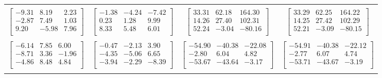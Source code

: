 \documentclass[12pt,a4paper,onesided]{report}
\begin{document}
\begin{table}[h]
{\begin{tabular}{cccc}
			\\&&&
			\\
				$\begin{bmatrix}-9.31&8.19&2.23\\-2.87&7.49&1.03\\9.20&-5.98&7.96\\\end{bmatrix}$&
				$\begin{bmatrix}-1.38&-4.24&-7.42\\0.23&1.28&9.99\\8.33&5.48&6.01\\\end{bmatrix}$&
				$\begin{bmatrix}33.31&62.18&164.30\\14.26&27.40&102.31\\52.24&-3.04&-80.16\\\end{bmatrix}$&
				$\begin{bmatrix}33.29&62.25&164.22\\14.25&27.42&102.29\\52.21&-3.09&-80.15\\\end{bmatrix}$
			\\&&&
			\\
				$\begin{bmatrix}-6.14&7.85&6.00\\-8.71&3.36&-1.96\\-4.86&8.48&4.84\\\end{bmatrix}$&
				$\begin{bmatrix}-0.47&-2.13&3.90\\-4.35&-5.06&6.65\\-3.94&-2.29&-8.39\\\end{bmatrix}$&
				$\begin{bmatrix}-54.90&-40.38&-22.08\\-2.80&6.04&4.82\\-53.67&-43.64&-3.17\\\end{bmatrix}$&
				$\begin{bmatrix}-54.91&-40.38&-22.12\\-2.77&6.07&4.74\\-53.71&-43.67&-3.19\\\end{bmatrix}$
			\\&&&
			\\

\end{tabular}}
\end{table}
\end{document}

